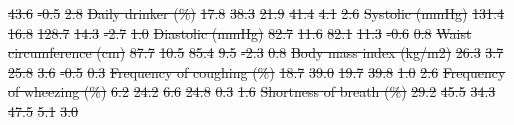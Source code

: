 \documentclass[
  letterpaper,
  DIV=11,
  numbers=noendperiod]{scrartcl}
\makeatletter
\renewenvironment{table}%
   {\renewcommand\familydefault\sfdefault
    \@float{table}}
   {\end@float}
\providecommand{\DIFdel}[1]{{\protect\color{red}\sout{#1}}}                      %
\providecommand{\DIFdelFL}[1]{\DIFdel{#1}} %
\makeatother
\begin{document}
\begin{table}
\DIFdelFL{43.6 }%
\DIFdelFL{-0.5 }%
\DIFdelFL{2.8}%
\DIFdelFL{Daily drinker (\%) }%
\DIFdelFL{17.8 }%
\DIFdelFL{38.3 }%
\DIFdelFL{21.9 }%
\DIFdelFL{41.4 }%
\DIFdelFL{4.1 }%
\DIFdelFL{2.6}%
\DIFdelFL{Systolic (mmHg) }%
\DIFdelFL{131.4 }%
\DIFdelFL{16.8 }%
\DIFdelFL{128.7 }%
\DIFdelFL{14.3 }%
\DIFdelFL{-2.7 }%
\DIFdelFL{1.0}%
\DIFdelFL{Diastolic (mmHg) }%
\DIFdelFL{82.7 }%
\DIFdelFL{11.6 }%
\DIFdelFL{82.1 }%
\DIFdelFL{11.3 }%
\DIFdelFL{-0.6 }%
\DIFdelFL{0.8}%
\DIFdelFL{Waist circumference (cm) }%
\DIFdelFL{87.7 }%
\DIFdelFL{10.5 }%
\DIFdelFL{85.4 }%
\DIFdelFL{9.5 }%
\DIFdelFL{-2.3 }%
\DIFdelFL{0.8}%
\DIFdelFL{Body mass index (kg/m2) }%
\DIFdelFL{26.3 }%
\DIFdelFL{3.7 }%
\DIFdelFL{25.8 }%
\DIFdelFL{3.6 }%
\DIFdelFL{-0.5 }%
\DIFdelFL{0.3}%
\DIFdelFL{Frequency of coughing (\%) }%
\DIFdelFL{18.7 }%
\DIFdelFL{39.0 }%
\DIFdelFL{19.7 }%
\DIFdelFL{39.8 }%
\DIFdelFL{1.0 }%
\DIFdelFL{2.6}%
\DIFdelFL{Frequency of wheezing (\%) }%
\DIFdelFL{6.2 }%
\DIFdelFL{24.2 }%
\DIFdelFL{6.6 }%
\DIFdelFL{24.8 }%
\DIFdelFL{0.3 }%
\DIFdelFL{1.6}%
\DIFdelFL{Shortness of breath (\%) }%
\DIFdelFL{29.2 }%
\DIFdelFL{45.5 }%
\DIFdelFL{34.3 }%
\DIFdelFL{47.5 }%
\DIFdelFL{5.1 }%
\DIFdelFL{3.0}%

\end{table}
\end{document}
